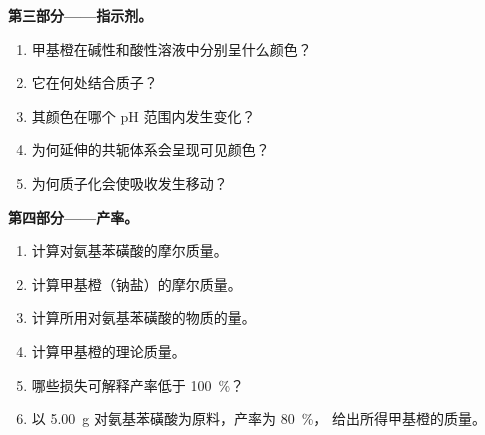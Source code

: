 \begin{problem}
\medskip
\noindent\textbf{第三部分——指示剂。}
\begin{enumerate}[resume]
  \item 甲基橙在碱性和酸性溶液中分别呈什么颜色？
  \item 它在何处结合质子？
  \item 其颜色在哪个 pH 范围内发生变化？
  \item 为何延伸的共轭体系会呈现可见颜色？
  \item 为何质子化会使吸收发生移动？
\end{enumerate}

\medskip
\noindent\textbf{第四部分——产率。}
\begin{enumerate}[resume]
  \item 计算对氨基苯磺酸的摩尔质量。
  \item 计算甲基橙（钠盐）的摩尔质量。
  \item 计算所用对氨基苯磺酸的物质的量。
  \item 计算甲基橙的理论质量。
  \item 哪些损失可解释产率低于 100~\%？
  \item 以 \qty{5.00}{g} 对氨基苯磺酸为原料，产率为 80~\%，
        给出所得甲基橙的质量。
\end{enumerate}
\end{problem}
